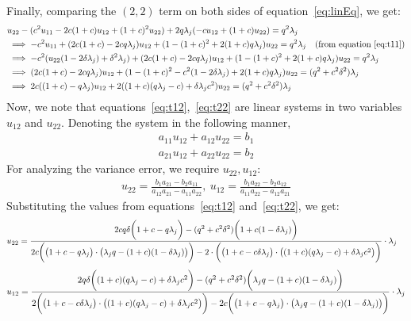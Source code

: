 Finally, comparing the $(2,2)$ term on both sides of equation~\ref{eq:linEq}, we get:
\begin{align}
\label{eq:t22}
&u_{22}-(c^2u_{11}-2c(1+c)u_{12}+(1+c)^2u_{22})+2q \lambda_j(-cu_{12}+(1+c)u_{22})=q ^2\lambda_j\nonumber\\
&\implies-c^2u_{11}+(2c(1+c)-2cq \lambda_j)u_{12}+(1-(1+c)^2+2(1+c)q \lambda_j)u_{22}=q ^2\lambda_j\quad(\text{from equation}~\ref{eq:t11})\nonumber\\
&\implies-c^2(u_{22}(1-2\delta\lambda_j)+\delta^2\lambda_j)+(2c(1+c)-2cq \lambda_j)u_{12}+(1-(1+c)^2+2(1+c)q \lambda_j)u_{22}=q ^2\lambda_j\nonumber\\
&\implies(2c(1+c)-2cq \lambda_j)u_{12}+(1-(1+c)^2-c^2(1-2\delta\lambda_j)+2(1+c)q \lambda_j)u_{22}=(q ^2+c^2\delta^2)\lambda_j\nonumber\\
&\implies2c((1+c)-q \lambda_j)u_{12}+2((1+c)(q \lambda_j-c)+\delta\lambda_jc^2)u_{22}=(q ^2+c^2\delta^2)\lambda_j
\end{align}
Now, we note that equations~\ref{eq:t12},~\ref{eq:t22} are linear systems in two variables $u_{12}$ and $u_{22}$. Denoting the system in the following manner,
\begin{align*}
a_{11} u_{12} + a_{12} u_{22} = b_1\\
a_{21} u_{12} + a_{22} u_{22} = b_2
\end{align*}
For analyzing the variance error, we require $u_{22},u_{12}$:
\begin{align*}
u_{22}=\frac{b_1a_{21}-b_2a_{11}}{a_{12}a_{21}-a_{11}a_{22}}, \ u_{12}=\frac{b_1a_{22}-b_2a_{12}}{a_{11}a_{22}-a_{12}a_{21}}
\end{align*}
Substituting the values from equations~\ref{eq:t12} and~\ref{eq:t22}, we get:
\begin{align}
\label{eq:u22-1}
u_{22}&=\frac{2cq \delta\bigg(1+c-q \lambda_j\bigg)-(q ^2+c^2\delta^2)\bigg(1+c(1-\delta\lambda_j)\bigg)}{2c\bigg( \big(1+c-q \lambda_j\big)\cdot \big(\lambda_j q -(1+c)(1-\delta\lambda_j)\big) \bigg)-2\cdot\bigg(\big(1+c-c\delta\lambda_j\big)\cdot\big((1+c)(q \lambda_j-c)+\delta\lambda_jc^2\big) \bigg)}\cdot\lambda_j
\end{align}
\begin{align}
\label{eq:u12-1}
u_{12}=\frac{2q \delta\bigg((1+c)(q \lambda_j-c)+\delta\lambda_jc^2\bigg)-(q ^2+c^2\delta^2)\bigg(\lambda_jq -(1+c)(1-\delta\lambda_j)\bigg)}{2\bigg(\big(1+c-c\delta\lambda_j\big)\cdot\big((1+c)(q \lambda_j-c)+\delta\lambda_jc^2\big) \bigg)-2c\bigg( \big(1+c-q \lambda_j\big)\cdot \big(\lambda_j q -(1+c)(1-\delta\lambda_j)\big) \bigg)}\cdot\lambda_j
\end{align}
